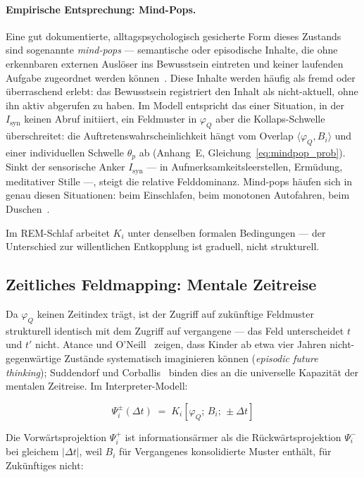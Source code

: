 \documentclass[11pt,a4paper]{article}
\begin{document}
\paragraph{Empirische Entsprechung: Mind-Pops.}
Eine gut dokumentierte, alltagspsychologisch gesicherte Form dieses Zustands
sind sogenannte \emph{mind-pops} — semantische oder episodische Inhalte,
die ohne erkennbaren externen Auslöser ins Bewusstsein eintreten und keiner
laufenden Aufgabe zugeordnet werden können~\citep{kvavilashvili2004}.
Diese Inhalte werden häufig als fremd oder überraschend erlebt: das
Bewusstsein registriert den Inhalt als nicht-aktuell, ohne ihn aktiv abgerufen
zu haben. Im Modell entspricht das einer Situation, in der $I_{\mathrm{syn}}$
keinen Abruf initiiert, ein Feldmuster in $\varphi_Q$ aber die
Kollaps-Schwelle überschreitet: die Auftretenswahrscheinlichkeit hängt
vom Overlap $\langle \varphi_Q, B_i \rangle$ und einer individuellen
Schwelle $\theta_p$ ab (Anhang~E, Gleichung~\eqref{eq:mindpop_prob}).
Sinkt der sensorische Anker $I_{\mathrm{syn}}$ — in Aufmerksamkeitsleerstellen,
Ermüdung, meditativer Stille —, steigt die relative Felddominanz.
Mind-pops häufen sich in genau diesen Situationen: beim Einschlafen,
beim monotonen Autofahren, beim Duschen~\citep{kvavilashvili2004}.

Im REM-Schlaf arbeitet $K_i$ unter denselben formalen Bedingungen —
der Unterschied zur willentlichen Entkopplung ist graduell, nicht strukturell.

\subsection{Zeitliches Feldmapping: Mentale Zeitreise}

Da $\varphi_Q$ keinen Zeitindex trägt, ist der Zugriff auf zukünftige
Feldmuster strukturell identisch mit dem Zugriff auf vergangene — das Feld
unterscheidet $t$ und $t'$ nicht. Atance und O'Neill~\citep{atance2001} zeigen,
dass Kinder ab etwa vier Jahren nicht-gegenwärtige Zustände systematisch
imaginieren können (\emph{episodic future thinking}); Suddendorf und
Corballis~\citep{suddendorf2007} binden dies an die universelle Kapazität der
mentalen Zeitreise. Im Interpreter-Modell:

\begin{equation}
  \Psi_i^{\pm}(\Delta t) \;=\; K_i[\varphi_Q;\, B_i;\, \pm\Delta t]
  \label{eq:eft_proj}
\end{equation}

Die Vorwärtsprojektion $\Psi_i^+$ ist informationsärmer als die
Rückwärtsprojektion $\Psi_i^-$ bei gleichem $|\Delta t|$, weil $B_i$
für Vergangenes konsolidierte Muster enthält, für Zukünftiges nicht:
\end{document}
